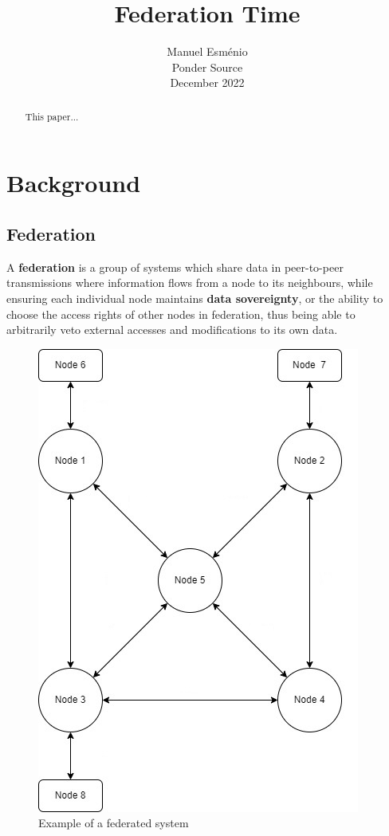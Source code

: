 \documentclass[journal]{IEEEtran}
\begin{document}
\title{Federation Time}

\author{Manuel Esménio \\ Ponder Source \\ December 2022}%

	
\maketitle
\thispagestyle{empty}

\begin{abstract}
	 \cite{Eugene_A._Feinberg-MDP} This paper...
\end{abstract}


\IEEEpeerreviewmaketitle

\section{Background}

\subsection{Federation}

A \textbf{federation} is a group of systems which share data in peer-to-peer transmissions where information flows from a node to its neighbours, while ensuring each individual node maintains \textbf{data sovereignty}, or the ability to choose the access rights of other nodes in federation, thus being able to arbitrarily veto external accesses and modifications  to its own data. 

\begin{figure}[h]
	\hfill\includegraphics[scale = 0.6]{FEDERATION_1}\hspace*{\fill}
	\caption{Example of a federated system}
	\label{fig:FED1}
\end{figure}
\end{document}
